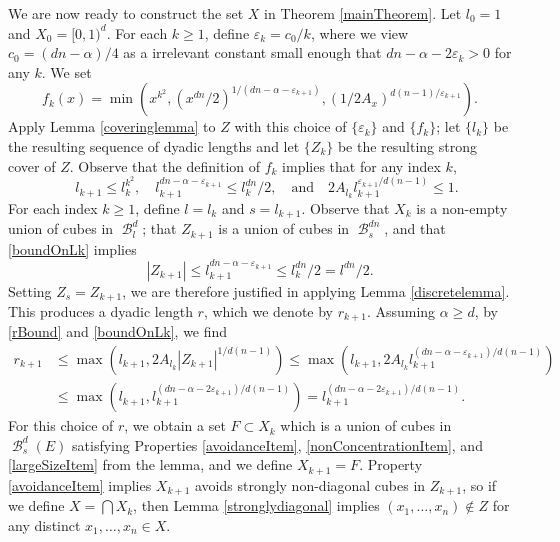 \documentclass[dvipsnames,letterpaper,12pt]{article}
\numberwithin{equation}{section}
\theoremstyle{plain}
\theoremstyle{remark}
\DeclareMathOperator{\B}{\mathcal{B}}
\begin{document}
We are now ready to construct the set $X$ in Theorem \ref{mainTheorem}. Let $l_0 = 1$ and $X_0 = [0,1)^d$. For each $k \geq 1$, define $\varepsilon_k = c_0/k$, where we view $c_0 = (dn - \alpha)/4$ as a irrelevant constant small enough that $dn - \alpha - 2\varepsilon_k > 0$ for any $k$. We set
%
\[	f_k(x) = \min \left( x^{k^2}, (x^{dn}/2)^{1/(dn - \alpha - \varepsilon_{k+1})}, (1/2A_x)^{d(n-1)/\varepsilon_{k+1}} \right). \]
%
Apply Lemma \ref{coveringlemma} to $Z$ with this choice of $\{\varepsilon_k\}$ and $\{ f_k \}$; let $\{ l_k \}$ be the resulting sequence of dyadic lengths and let $\{Z_k\}$ be the resulting strong cover of $Z$. Observe that the definition of $f_k$ implies that for any index $k$,
%
\begin{equation} \label{boundOnLk}
	\quad l_{k+1} \leq l_k^{k^2}, \quad l_{k+1}^{dn - \alpha - \varepsilon_{k+1}} \leq l_k^{dn}/2, \quad \text{and} \quad 2A_{l_k} l_{k+1}^{\varepsilon_{k+1}/d(n-1)} \leq 1.
\end{equation}
%
For each index $k \geq 1$, define $l = l_k$ and $s = l_{k+1}$. Observe that $X_k$ is a non-empty union of cubes in $\B^d_l$; that $Z_{k+1}$ is a union of cubes in $\B^{dn}_s$, and that \eqref{boundOnLk} implies
%
\[ |Z_{k+1}| \leq l_{k+1}^{dn - \alpha - \varepsilon_{k+1}} \leq l_k^{dn}/2 = l^{dn}/2. \]
%
Setting $Z_s = Z_{k+1}$, we are therefore justified in applying Lemma \ref{discretelemma}. This produces a dyadic length $r$, which we denote by $r_{k+1}$. Assuming
$\alpha \geq d$, by \eqref{rBound} and \eqref{boundOnLk}, we find
%
\begin{equation} \label{rKBound}
\begin{aligned}
	r_{k+1} &\leq \max \left(l_{k+1}, 2 A_{l_k} |Z_{k+1}|^{1/d(n-1)} \right) \leq \max \left(l_{k+1}, 2 A_{l_k} l_{k+1}^{(dn - \alpha - \varepsilon_{k+1})/d(n-1)} \right)\\
	&\leq \max \left(l_{k+1}, l_{k+1}^{(dn - \alpha - 2\varepsilon_{k+1})/d(n-1)} \right) = l_{k+1}^{(dn - \alpha - 2\varepsilon_{k+1})/d(n-1)}.
\end{aligned}
\end{equation}
%
For this choice of $r$, we obtain a set $F \subset X_k$ which is a union of cubes in $\B^d_s(E)$ satisfying Properties \ref{avoidanceItem}, \ref{nonConcentrationItem}, and \ref{largeSizeItem} from the lemma, and we define $X_{k+1} = F$. Property \ref{avoidanceItem} implies $X_{k+1}$ avoids strongly non-diagonal cubes in $Z_{k+1}$, so if we define $X = \bigcap X_k$, then Lemma \ref{stronglydiagonal} implies $(x_1, \dots, x_n) \not \in Z$ for any distinct $x_1, \dots, x_n \in X$.
\end{document}
